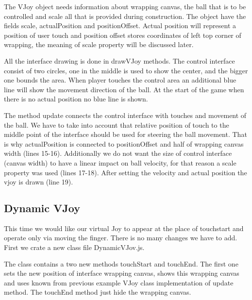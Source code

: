 \begin{explain}
The VJoy object needs information about wrapping canvas, the ball that is to be controlled and scale all that is provided during construction. The object have the fields scale, actualPosition and positionOffset. Actual position will represent a position of user touch and position offset stores coordinates of left top corner of wrapping, the meaning of scale property will be discussed later.

All the interface drawing is done in drawVJoy methods. The control interface consist of two circles, one in the middle is used to show the center, and the bigger one bounds the area. When player touches the control area an additional blue line will show the movement direction of the ball. At the start of the game when there is no actual position no blue line is shown.

The method update connects the control interface with touches and movement of the ball. We have to take into account that relative position of touch to the middle point of the interface should be used for steering the ball movement. That is why actualPosition is connected to positionOffset and half of wrapping canvas width (lines 15-16). Additionally we do not want the size of control interface (canvas width) to have a linear impact on ball velocity, for that reason a scale property was used (lines 17-18). After setting the velocity and actual position the vjoy is drawn (line 19).
 \end{explain}

\subsection{Dynamic VJoy}
This time we would like our virtual Joy to appear at the place of touchstart and operate only via moving the finger. There is no many changes we have to add. First we crate a new class file DynamicVJov.js.


\begin{explain}
The class contains a two new methods touchStart and touchEnd. The first one sets the new position of interface wrapping canvas, shows this wrapping canvas and uses known from previous example VJoy class implementation of update method. The touchEnd method just hide the wrapping canvas.
\end{explain}


